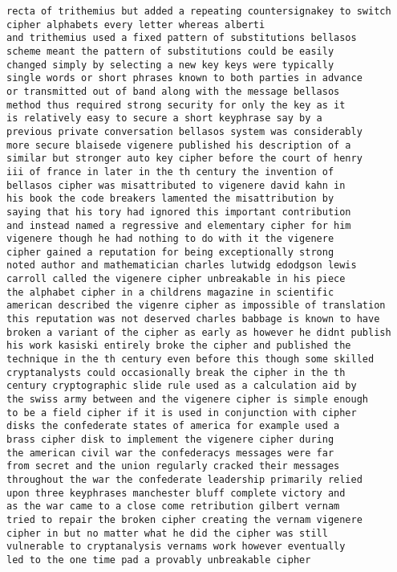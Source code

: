 \documentclass[a4paper]{article}
\begin{document}
\begin{verbatim}
recta of trithemius but added a repeating countersignakey to switch 
cipher alphabets every letter whereas alberti
and trithemius used a fixed pattern of substitutions bellasos
scheme meant the pattern of substitutions could be easily
changed simply by selecting a new key keys were typically
single words or short phrases known to both parties in advance
or transmitted out of band along with the message bellasos
method thus required strong security for only the key as it
is relatively easy to secure a short keyphrase say by a
previous private conversation bellasos system was considerably
more secure blaisede vigenere published his description of a
similar but stronger auto key cipher before the court of henry
iii of france in later in the th century the invention of
bellasos cipher was misattributed to vigenere david kahn in
his book the code breakers lamented the misattribution by
saying that his tory had ignored this important contribution
and instead named a regressive and elementary cipher for him
vigenere though he had nothing to do with it the vigenere
cipher gained a reputation for being exceptionally strong
noted author and mathematician charles lutwidg edodgson lewis
carroll called the vigenere cipher unbreakable in his piece
the alphabet cipher in a childrens magazine in scientific
american described the vigenre cipher as impossible of translation
this reputation was not deserved charles babbage is known to have
broken a variant of the cipher as early as however he didnt publish
his work kasiski entirely broke the cipher and published the
technique in the th century even before this though some skilled
cryptanalysts could occasionally break the cipher in the th
century cryptographic slide rule used as a calculation aid by
the swiss army between and the vigenere cipher is simple enough
to be a field cipher if it is used in conjunction with cipher
disks the confederate states of america for example used a
brass cipher disk to implement the vigenere cipher during
the american civil war the confederacys messages were far
from secret and the union regularly cracked their messages
throughout the war the confederate leadership primarily relied
upon three keyphrases manchester bluff complete victory and
as the war came to a close come retribution gilbert vernam
tried to repair the broken cipher creating the vernam vigenere
cipher in but no matter what he did the cipher was still
vulnerable to cryptanalysis vernams work however eventually
led to the one time pad a provably unbreakable cipher
\end{verbatim}
\end{document}
